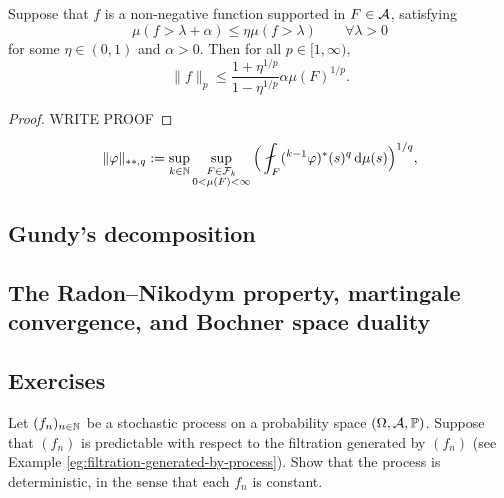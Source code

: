 \begin{lem}
  Suppose that $f$ is a non-negative function supported in $F \in \mathcal{A}$, satisfying
  \begin{equation*}
    \mu(f > \lambda + \alpha) \leq \eta \mu(f > \lambda) \qquad \forall \lambda > 0
  \end{equation*}
  for some $\eta \in (0,1)$ and $\alpha > 0$.
  Then for all $p \in [1,\infty)$,
  \begin{equation*}
    \|f\|_p \leq \frac{1 + \eta^{1/p}}{1 - \eta^{1/p}} \alpha \mu(F)^{1/p}.
  \end{equation*}
\end{lem}

\begin{proof}
  {\color{red} WRITE PROOF}
\end{proof}


{\color{blue}

\begin{equation*}
  \|\phi\|_{**,q} := \sup_{k \in \N} \sup_{\substack{F \in \mc{F}_k \\ 0 < \mu(F) < \infty}} \Big( \fint_{F} ({}^{k-1} \phi)^{*}(s)^q \, \dd\mu(s) \Big)^{1/q},
\end{equation*}

}



\subsection{Gundy's decomposition}

\subsection{The Radon--Nikodym property, martingale convergence, and Bochner space duality}\label{sec:RNP}

\subsection*{Exercises}

\begin{exercise}
  Let $(f_n)_{n \in \mathbb{N}}$ be a stochastic process on a probability space $(\Omega,\mathcal{A},\mathbb{P})$.
  Suppose that $(f_n)$ is predictable with respect to the filtration generated by $(f_n)$ (see Example \ref{eg:filtration-generated-by-process}).
  Show that the process is deterministic, in the sense that each $f_n$ is constant.
\end{exercise}

